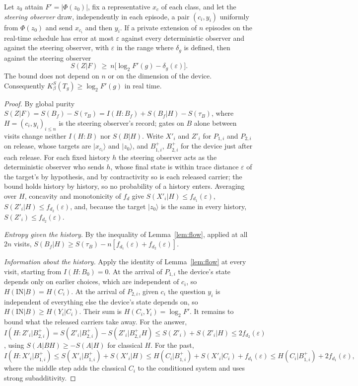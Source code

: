 \begin{lemma}\label{lem:classes-lower}
Let $z_0$ attain $F'=|\Phi(z_0)|$, fix a representative $x_c$ of each class, and let the \emph{steering observer} draw, independently in each episode, a pair $(c_i,y_i)$ uniformly from $\Phi(z_0)$ and send $x_{c_i}$ and then $y_i$. If a private extension of $n$ episodes on the real-time schedule has error at most $\varepsilon$ against every deterministic observer and against the steering observer, with $\varepsilon$ in the range where $\delta_g$ is defined, then against the steering observer
\[
S(Z|F)\ \ge\ n\bigl[\log_2F'(g)-\delta_g(\varepsilon)\bigr].
\]
The bound does not depend on $n$ or on the dimension of the device. Consequently $K_\beta^S(T_g)\ge\log_2F'(g)$ in real time.
\end{lemma}
\begin{proof}
By global purity $S(Z|F)=S(B_f)-S(\tau_B)=I(H{:}B_f)+S(B_f|H)-S(\tau_B)$, where $H=(c_i,y_i)_{i\le n}$ is the steering observer's record; gates on $B$ alone between visits change neither $I(H{:}B)$ nor $S(B|H)$. Write $X'_i$ and $Z'_i$ for $P_{1,i}$ and $P_{2,i}$ on release, whose targets are $|x_{c_i}\rangle$ and $|z_0\rangle$, and $B^+_{1,i}$, $B^+_{2,i}$ for the device just after each release. For each fixed history $h$ the steering observer acts as the deterministic observer who sends $h$, whose final state is within trace distance $\varepsilon$ of the target's by hypothesis, and by contractivity so is each released carrier; the bound holds history by history, so no probability of a history enters. Averaging over $H$, concavity and monotonicity of $f_d$ give $S(X'_i|H)\le f_{d_1}(\varepsilon)$, $S(Z'_i|H)\le f_{d_2}(\varepsilon)$, and, because the target $|z_0\rangle$ is the same in every history, $S(Z'_i)\le f_{d_2}(\varepsilon)$.

\emph{Entropy given the history.} By the inequality of Lemma~\ref{lem:flow}, applied at all $2n$ visits, $S(B_f|H)\ge S(\tau_B)-n[f_{d_1}(\varepsilon)+f_{d_2}(\varepsilon)]$.

\emph{Information about the history.} Apply the identity of Lemma~\ref{lem:flow} at every visit, starting from $I(H{:}B_0)=0$. At the arrival of $P_{1,i}$ the device's state depends only on earlier choices, which are independent of $c_i$, so $H(\mathrm{IN}|B)=H(C_i)$. At the arrival of $P_{2,i}$, given $c_i$ the question $y_i$ is independent of everything else the device's state depends on, so $H(\mathrm{IN}|B)\ge H(Y_i|C_i)$. Their sum is $H(C_i,Y_i)=\log_2F'$. It remains to bound what the released carriers take away. For the answer, $I(H{:}Z'_i|B^+_{2,i})=S(Z'_i|B^+_{2,i})-S(Z'_i|B^+_{2,i}H)\le S(Z'_i)+S(Z'_i|H)\le2f_{d_2}(\varepsilon)$, using $S(A|BH)\ge-S(A|H)$ for classical $H$. For the past,
\[
I(H{:}X'_i|B^+_{1,i})\le S(X'_i|B^+_{1,i})+S(X'_i|H)\le H(C_i|B^+_{1,i})+S(X'_i|C_i)+f_{d_1}(\varepsilon)\le H(C_i|B^+_{1,i})+2f_{d_1}(\varepsilon),
\]
where the middle step adds the classical $C_i$ to the conditioned system and uses strong subadditivity.


\end{proof}

